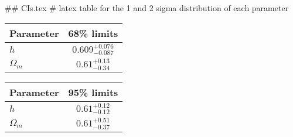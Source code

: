## CIs.tex
# latex table for the 1 and 2 sigma distribution of each parameter

\begin{tabular} { l  c}
 Parameter &  68\% limits\\
\hline
{\boldmath$h              $} & $0.609^{+0.076}_{-0.087}   $\\
{\boldmath$\Omega_m       $} & $0.61^{+0.13}_{-0.34}      $\\
\hline
\end{tabular}

\begin{tabular} { l  c}
 Parameter &  95\% limits\\
\hline
{\boldmath$h              $} & $0.61^{+0.12}_{-0.12}      $\\
{\boldmath$\Omega_m       $} & $0.61^{+0.51}_{-0.37}      $\\
\hline
\end{tabular}
